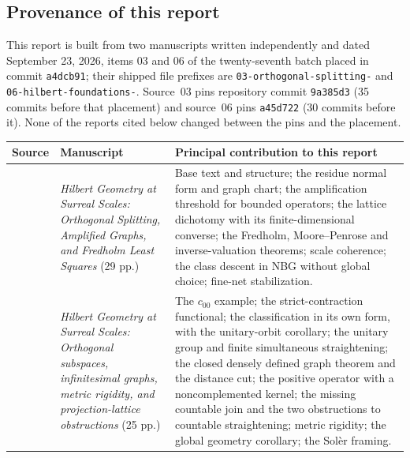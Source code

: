 \documentclass[11pt,letterpaper]{article}
\numberwithin{equation}{section}
\theoremstyle{definition}
\theoremstyle{remark}
\newcommand{\fn}[1]{\nolinkurl{#1}}
\begin{document}
\subsection{Provenance of this report}\label{hgeo:sub:provenance}
This report is built from two manuscripts written independently and dated
September 23, 2026, items 03 and 06 of the twenty-seventh batch placed in
commit \texttt{a4dcb91}; their shipped file prefixes are
\fn{03-orthogonal-splitting-} and \fn{06-hilbert-foundations-}.
Source~03 pins repository commit \texttt{9a385d3} (35 commits before that
placement) and source~06 pins \texttt{a45d722} (30 commits before it). None
of the reports cited below changed between the pins and the placement.

\begin{center}
\small
\renewcommand{\arraystretch}{1.15}
\begin{tabular}{>{\raggedright\arraybackslash}p{}>{\raggedright\arraybackslash}p{}>{\raggedright\arraybackslash}p{}}
\toprule
Source & Manuscript & Principal contribution to this report\\
\midrule
03 & \emph{Hilbert Geometry at Surreal Scales: Orthogonal Splitting,
Amplified Graphs, and Fredholm Least Squares} (29 pp.) &
Base text and structure; the residue normal form and graph chart; the
amplification threshold for bounded operators; the lattice dichotomy with
its finite-dimensional converse; the Fredholm, Moore--Penrose and
inverse-valuation theorems; scale coherence; the class descent in NBG
without global choice; fine-net stabilization.\\
06 & \emph{Hilbert Geometry at Surreal Scales: Orthogonal subspaces,
infinitesimal graphs, metric rigidity, and projection-lattice obstructions}
(25 pp.) &
The $c_{00}$ example; the strict-contraction functional; the classification
in its own form, with the unitary-orbit corollary; the unitary group and
finite simultaneous straightening; the closed densely defined graph theorem
and the distance cut; the positive operator with a noncomplemented kernel;
the missing countable join and the two obstructions to countable
straightening; metric rigidity; the global geometry corollary; the Sol\`er
framing.\\
\bottomrule
\end{tabular}
\end{center}
\end{document}
